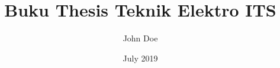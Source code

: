 \documentclass{Thesis-TE-ITS}
\title{Buku Thesis Teknik Elektro ITS}
\author{John Doe}
\date{July 2019}
\begin{document}
\singlespacing

\cleardoublepage

\cleardoublepage

\cleardoublepage
\begin{spacing}{1.5}

\cleardoublepage

\cleardoublepage

\cleardoublepage

\cleardoublepage

\cleardoublepage


\cleardoublepage
\end{spacing}
\end{document}
